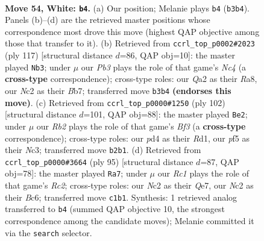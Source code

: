 \documentclass[11pt]{article}
\begin{document}
\clearpage

\begin{figure}[p]\centering
\begin{subfigure}{0.46\textwidth}\centering
\resizebox{\linewidth}{!}{%
\newchessgame
\chessboard[
  setfen={nr4k1/1q2br2/p3n3/P1p2p1p/3p1Pp1/1P4P1/QRNBP2P/2RN2K1 w - - 24 54},
  showmover=false,
  pgfstyle=straightmove, color=movearrow, markmove={b3-b4}
]}
\caption{}
\end{subfigure}\hfill
\begin{subfigure}{0.46\textwidth}\centering
\resizebox{\linewidth}{!}{%
\newchessgame
\chessboard[
  setfen={r5k1/1b3p2/1q1r2p1/1Pnp3p/pQpN3P/P3P1PB/3R1P2/3R2K1 b - - 60 59},
  showmover=false,
  pgfstyle=straightmove, color=movearrow, markmove={c5-b3}
]}
\caption{}
\end{subfigure}
\\[4pt]
\begin{subfigure}{0.46\textwidth}\centering
\resizebox{\linewidth}{!}{%
\newchessgame
\chessboard[
  setfen={bqr1n1k1/r4pp1/1p1pp2p/8/1PPQPP2/2N2B1P/6P1/2RR3K w - - 49 52},
  showmover=false,
  pgfstyle=straightmove, color=movearrow, markmove={f3-e2}
]}
\caption{}
\end{subfigure}\hfill
\begin{subfigure}{0.46\textwidth}\centering
\resizebox{\linewidth}{!}{%
\newchessgame
\chessboard[
  setfen={6k1/2rrqp2/1pbpn1p1/7p/1PP1Pp1P/1B1R1N2/3Q1PP1/4R1K1 b - - 26 48},
  showmover=false,
  pgfstyle=straightmove, color=movearrow, markmove={c7-a7}
]}
\caption{}
\end{subfigure}
\caption{\textbf{Move 54, White: \texttt{b4}.} (a) Our position; Melanie plays \texttt{b4} (\texttt{b3b4}). Panels (b)--(d) are the retrieved master positions whose correspondence most drove this move (highest QAP objective among those that transfer to it). (b) Retrieved from \texttt{ccrl\_top\_p0002\#2023} (ply 117) [structural distance $d$=86, QAP obj=10]: the master played \texttt{Nb3}; under $\mu$ our \emph{Pb3} plays the role of that game's \emph{Nc4} (a \textbf{cross-type} correspondence); cross-type roles: our \emph{Q}a2 as their \emph{R}a8, our \emph{N}c2 as their \emph{B}b7; transferred move \texttt{b3b4} \textbf{(endorses this move)}. (c) Retrieved from \texttt{ccrl\_top\_p0000\#1250} (ply 102) [structural distance $d$=101, QAP obj=88]: the master played \texttt{Be2}; under $\mu$ our \emph{Rb2} plays the role of that game's \emph{Bf3} (a \textbf{cross-type} correspondence); cross-type roles: our \emph{p}d4 as their \emph{R}d1, our \emph{p}f5 as their \emph{N}c3; transferred move \texttt{b2b1}. (d) Retrieved from \texttt{ccrl\_top\_p0000\#3664} (ply 95) [structural distance $d$=87, QAP obj=78]: the master played \texttt{Ra7}; under $\mu$ our \emph{Rc1} plays the role of that game's \emph{Rc2}; cross-type roles: our \emph{N}c2 as their \emph{Q}e7, our \emph{N}c2 as their \emph{B}c6; transferred move \texttt{c1b1}. Synthesis: 1 retrieved analog transferred to \texttt{b4} (summed QAP objective 10, the strongest correspondence among the candidate moves); Melanie committed it via the \texttt{search} selector.}
\label{fig:thought-m106}
\end{figure}
\end{document}
